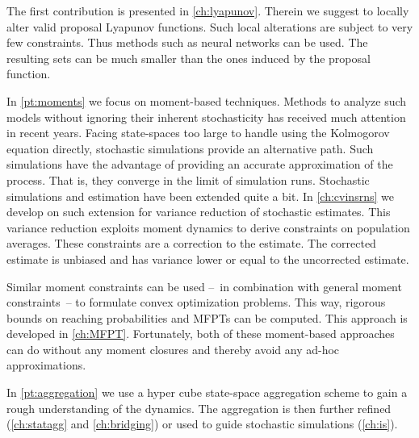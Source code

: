 The first contribution is presented in \autoref{ch:lyapunov}.
Therein we suggest to locally alter valid proposal Lyapunov functions.
Such local alterations are subject to very few constraints.
Thus methods such as neural networks can be used.
The resulting sets can be much smaller than the ones induced by the proposal function.

In \autoref{pt:moments} we focus on moment-based techniques.
Methods to analyze such models without ignoring their inherent stochasticity has received much attention in recent years.
Facing state-spaces too large to handle using the Kolmogorov equation directly, stochastic simulations \parencite{gillespie1977exact} provide an alternative path.
Such simulations have the advantage of providing an accurate approximation of the process.
That is, they converge in the limit of simulation runs.
Stochastic simulations and estimation have been extended quite a bit.
In \autoref{ch:cvinsrns} we develop on such extension for variance reduction of stochastic estimates.
This variance reduction exploits moment dynamics to derive constraints on population averages.
These constraints are a correction to the estimate.
The corrected estimate is unbiased and has variance lower or equal to the uncorrected estimate.

Similar moment constraints can be used  --~in combination with general moment constraints~-- to formulate convex optimization problems.
This way, rigorous bounds on reaching probabilities and \aclp{MFPT} can be computed.
This approach is developed in \autoref{ch:MFPT}.
Fortunately, both of these moment-based approaches can do without any moment closures
and thereby avoid any ad-hoc approximations.

In \autoref{pt:aggregation} we use a hyper cube state-space aggregation scheme to gain a rough understanding of the dynamics.
The aggregation is then further refined (\autoref{ch:statagg} and \autoref{ch:bridging}) or used to guide stochastic simulations (\autoref{ch:is}).

